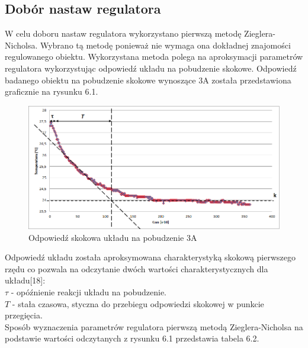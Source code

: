 \documentclass[oneside]{mgr}
\begin{document}
\subsection{Dobór nastaw regulatora}
W celu doboru nastaw regulatora wykorzystano pierwszą metodę Zieglera- Nicholsa. Wybrano tą metodę ponieważ nie wymaga ona dokładnej znajomości regulowanego obiektu. Wykorzystana metoda polega na aproksymacji parametrów regulatora wykorzystując odpowiedź układu na pobudzenie skokowe. Odpowiedź badanego obiektu na pobudzenie skokowe wynoszące 3A została przedstawiona graficznie na rysunku 6.1.
\begin{center}
\begin{figure}[h!]
    \centering
    \includegraphics[width=\textwidth]{Odpowiedz_skokowa_regulacja.png}
    \caption{Odpowiedź skokowa układu na pobudzenie 3A}
    \end{figure}
\end{center}

Odpowiedź układu została aproksymowana charakterystyką skokową pierwszego rzędu co pozwala na odczytanie dwóch wartości charakterystycznych dla układu[18]:\\
$\tau$ - opóźnienie reakcji układu na pobudzenie. \\
$T$ - stała czasowa, styczna do przebiegu odpowiedzi skokowej w punkcie przegięcia.\\

Sposób wyznaczenia parametrów regulatora pierwszą metodą Zieglera-Nicholsa na podstawie wartości odczytanych z rysunku 6.1 przedstawia tabela 6.2.
\end{document}
